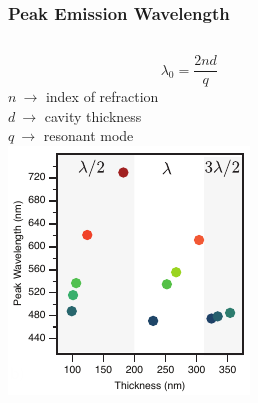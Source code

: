 \documentclass{beamer}
\begin{document}
        \begin{frame}
            \frametitle{Peak Emission Wavelength}
            \begin{columns}
                \begin{column}{0.4\textwidth}
					\centering
					$$\lambda_0=\frac{2nd}{q}$$
					$n\ \rightarrow$ index of refraction\\
					$d\ \rightarrow$ cavity thickness\\
					$q\ \rightarrow$ resonant mode\\
					\includegraphics[width=\textwidth]{images/n1_peak_emission.png}
                \end{column}
                \begin{column}{0.6\textwidth}
					\centering

\end{column}
\end{columns}
\end{frame}
\end{document}
